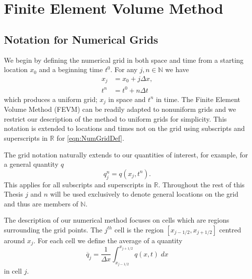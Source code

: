 
\chapter{Finite Element Volume Method}
\label{chp:HFVMMethod}


\cite{Pitt-2018-61}






\section{Notation for Numerical Grids}
We begin by defining the numerical grid in both space and time from a starting location $x_0$ and a beginning time $t^0$. For any $j,n \in \mathbb{N}$ we have
\begin{subequations}
\begin{align}
x_j &= x_0 + j \Delta x,  \\
t^n &= t^0 + n \Delta t
\end{align}
\label{eqn:NumGridDef}
\end{subequations}
which produces a uniform grid; $x_j$ in space and $t^n$ in time. The Finite Element Volume Method (FEVM) can be readily adapted to nonuniform grids and we restrict our description of the method to uniform grids for simplicity. This notation is extended to locations and times not on the grid using subscripts and superscripts in $\mathbb{R}$ for \eqref{eqn:NumGridDef}.

The grid notation naturally extends to our quantities of interest, for example, for a general quantity $q$
\begin{equation}
q^n_j = q(x_j ,t^n). 
\end{equation}
This applies for all subscripts and superscripts in $\mathbb{R}$. Throughout the rest of this Thesis $j$ and $n$ will be used exclusively to denote general locations on the grid and thus are members of $\mathbb{N}$.

The description of our numerical method focuses on cells which are regions surrounding the grid points. The $j^{th}$ cell is the region $\left[x_{j - 1/2} , x_{j + 1/2}\right]$ centred around $x_j$. For each cell we define the average of a quantity
\begin{equation}
\overline{q}_j = \frac{1}{\Delta x} \int_{x_{j-1/2}}^{x_{j+1/2}} q(x,t) \; dx
\end{equation}
in cell $j$.

